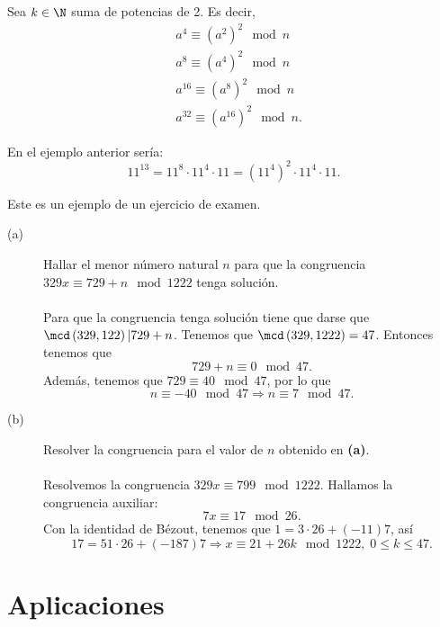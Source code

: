 \begin{ftheorem}
\normalfont Sea $\displaystyle k\in\N $ suma de potencias de 2. Es decir, 
\[
\begin{split}
& a^{4} \equiv \left(a^{2}\right)^{2} \mod n \\
& a^{8} \equiv \left(a^{4}\right)^{2} \mod n \\
& a^{16} \equiv \left(a^{8}\right)^{2} \mod n \\
& a^{32} \equiv \left(a^{16}\right)^{2} \mod n.
\end{split}
\]
\end{ftheorem}

\begin{eg}
\normalfont En el ejemplo anterior sería:
\[11^{13} = 11^{8} \cdot 11^{4} \cdot 11 = \left(11^{4}\right)^{2} \cdot 11^{4} \cdot 11 .\]
\end{eg}

\begin{eg}
\normalfont Este es un ejemplo de un ejercicio de examen. 
\begin{description}
\item[(a)] Hallar el menor número natural $\displaystyle n $ para que la congruencia $\displaystyle 329 x \equiv 729 + n \mod1222 $ tenga solución. \\ \\
	Para que la congruencia tenga solución tiene que darse que $\displaystyle \mcd\left(329, 122\right) | 729 + n $. Tenemos que $\displaystyle \mcd\left(329, 1222\right) = 47 $. Entonces tenemos que 
	\[729 + n \equiv 0 \mod 47 .\]
Además, tenemos que $\displaystyle 729 \equiv 40 \mod 47 $, por lo que 
\[n \equiv -40 \mod 47 \Rightarrow n \equiv 7 \mod 47 .\]
\item[(b)] Resolver la congruencia para el valor de $\displaystyle n $ obtenido en \textbf{(a)}. \\ \\
Resolvemos la congruencia $\displaystyle 329 x \equiv 799 \mod 1222 $. Hallamos la congruencia auxiliar:
\[7x \equiv 17 \mod 26 .\]
Con la identidad de Bézout, tenemos que $\displaystyle 1 = 3 \cdot 26 + \left(-11\right)7 $, así
\[17 = 51 \cdot 26 + \left(-187\right)7 \Rightarrow x \equiv 21 + 26 k \mod 1222, \; 0 \leq k \leq 47 .\]
\end{description}
\end{eg}

\section{Aplicaciones}


